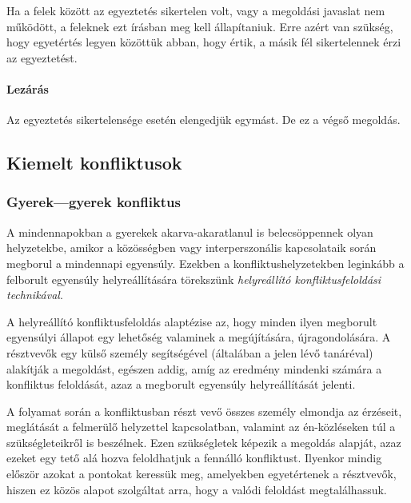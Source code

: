Ha a felek között az egyeztetés sikertelen volt, vagy a megoldási
javaslat nem működött, a feleknek ezt írásban meg kell állapítaniuk.
Erre azért van szükség, hogy egyetértés legyen közöttük abban, hogy
értik, a másik fél sikertelennek érzi az egyeztetést.

\hypertarget{lezaras}{%
\paragraph{Lezárás}\label{lezaras}}

Az egyeztetés sikertelensége esetén elengedjük egymást. De ez a végső
megoldás.

\hypertarget{kiemelt-konfliktusok}{%
\subsection{Kiemelt konfliktusok}\label{kiemelt-konfliktusok}}

\hypertarget{gyerek-gyerek-konfliktus}{%
\subsubsection{Gyerek---gyerek
konfliktus}\label{gyerek-gyerek-konfliktus}}

A mindennapokban a gyerekek akarva-akaratlanul is belecsöppennek\break
olyan
helyzetekbe, amikor a közösségben vagy interperszonális kapcsolataik
során megborul a mindennapi egyensúly. Ezekben a konfliktushelyzetekben
leginkább a felborult egyensúly helyreállítására törekszünk
\emph{helyreállító konfliktusfeloldási technikával}.

A helyreállító konfliktusfeloldás alaptézise az, hogy minden ilyen
megborult egyensúlyi állapot egy lehetőség valaminek a megújítására,
újragondolására. A résztvevők egy külső személy segítségével (általában
a jelen lévő tanáréval) alakítják a megoldást, egészen addig, amíg az
eredmény mindenki számára a konfliktus feloldását, azaz a
megborult egyensúly helyreállítását jelenti.

A folyamat során a konfliktusban részt vevő összes személy elmondja az
érzéseit, meglátását a felmerülő helyzettel kapcsolatban, valamint az
én-közléseken túl a szükségleteikről is beszélnek. Ezen szükségletek
képezik a megoldás alapját, azaz ezeket egy tető alá hozva feloldhatjuk
a fennálló konfliktust. Ilyenkor mindig először azokat a pontokat
keressük meg, amelyekben egyetértenek a résztvevők, hiszen ez közös
alapot szolgáltat arra, hogy a valódi feloldást megtalálhassuk.

